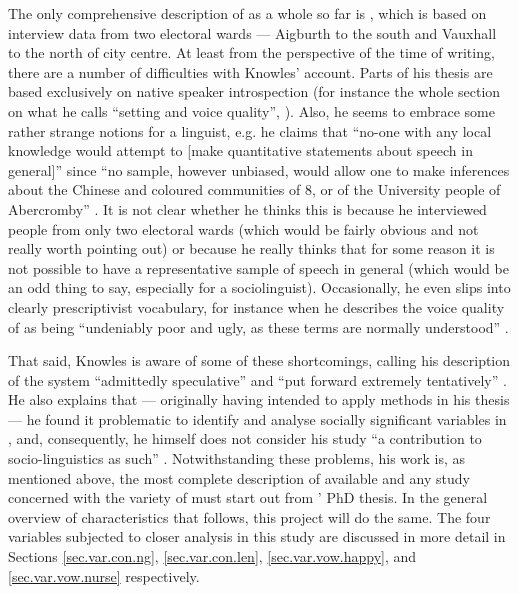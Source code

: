 The only comprehensive description of  as a whole so far is \citet{knowles1973}, which is based on interview data from two  electoral wards --- Aigburth to the south and Vauxhall to the north of  city centre.
At least from the perspective of the time of writing, there are a number of difficulties with Knowles' account.
Parts of his thesis are based exclusively on native speaker introspection (for instance the whole section on what he calls ``setting and voice quality'', \citealt[cf.][102]{knowles1973}).
Also, he seems to embrace some rather strange notions for a linguist, e.g. he claims that ``no-one with any local knowledge would attempt to [make quantitative statements about  speech in general]'' since ``no sample, however unbiased, would allow one to make inferences about the Chinese and coloured communities of  8, or of the University people of Abercromby'' \citep[3]{knowles1973}.
It is not clear whether he thinks this is because he interviewed people from only two electoral wards (which would be fairly obvious and not really worth pointing out) or because he really thinks that for some reason it is not possible to have a representative sample of  speech in general (which would be an odd thing to say, especially for a sociolinguist).
Occasionally, he even slips into clearly prescriptivist vocabulary, for instance when he describes the voice quality of  as being ``undeniably poor and ugly, as these terms are normally understood'' \citep[116]{knowles1973}.

That said, Knowles is aware of some of these shortcomings, calling his description of the   system ``admittedly speculative'' and ``put forward extremely tentatively'' \citep[111]{knowles1973}.
He also explains that --- originally having intended to apply  methods in his thesis --- he found it problematic to identify and analyse socially significant variables in , and, consequently, he himself does not consider his study ``a contribution to socio-linguistics as such'' \citep[cf.][1]{knowles1973}.
Notwithstanding these problems, his work is, as mentioned above, the most complete description of  available and any study concerned with the variety of  must start out from \citeauthor{knowles1973}' PhD thesis.
In the general overview of  characteristics that follows, this project will do the same.
The four variables subjected to closer analysis in this study are discussed in more detail in Sections \ref{sec.var.con.ng}, \ref{sec.var.con.len}, \ref{sec.var.vow.happy}, and \ref{sec.var.vow.nurse} respectively.

